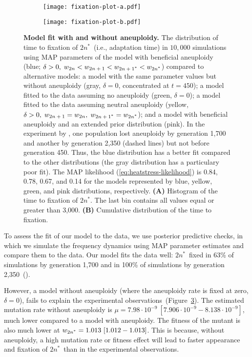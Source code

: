 \documentclass[12pt]{article}
\newcommand{\euwt}{\emph{$2n$}}
\newcommand{\anwt}{\emph{$2n+1$}}
\newcommand{\eumt}{\emph{$2n^*$}}
\newcommand{\anmt}{\emph{$2n+1^*$}}
\begin{document}
\begin{figure}[h!]
  \begin{subfigure}{0.5\textwidth}
      \centering
      \texttt{[image: fixation-plot-a.pdf]}      
      \label{fig:fit}
  \end{subfigure}
  \begin{subfigure}{0.5\textwidth}
      \centering
      \texttt{[image: fixation-plot-b.pdf]}      
      \label{fig:fit-cumulative}
  \end{subfigure}
  \caption{
    \textbf{Model fit with and without aneuploidy.}
    The distribution of time to fixation of \eumt\ (i.e., adaptation time) in $10,000$ simulations using MAP parameters of the model with beneficial aneuploidy (blue; $\delta>0, \; w_{\euwt}<w_{\anwt}<w_{\anmt}<w_{\eumt}$) compared to alternative models: a model with the same parameter values but without aneuploidy (gray, $\delta=0$, concentrated at $t=450$); a model fitted to the data assuming no aneuploidy (green, $\delta=0$); a model fitted to the data assuming neutral aneuploidy (yellow, $\delta>0, \; w_{\anwt}=w_{\euwt}, \; w_{\anmt}=w_{\eumt}$); and a model with beneficial aneuploidy and an extended prior distribution (pink).
In the experiment by \citet{Yona2012}, one population lost aneuploidy by generation 1,700 and another by generation 2,350 (dashed lines) but not before generation 450.
Thus, the blue distribution has a better fit compared to the other distributions (the gray distribution has a particulary poor fit).
The MAP likelihood (\cref{eq:heatstress-likelihood}) is 0.84, 0.78, 0.67, and 0.14 for the models represented by blue, yellow, green, and pink distributions, respectively. 
\textbf{(A)} Histogram of the time to fixation of \eumt. The last bin contains all values equal or greater than 3,000.
\textbf{(B)} Cumulative distribution of the time to fixation. 
     }
  \label{fig:2n*-fixation}
\end{figure}

To assess the fit of our model to the data, we use posterior predictive checks, in which we simulate the frequency dynamics using MAP parameter estimates and compare them to the data.
Our model fits the data well: \eumt\ fixed in 63\% of simulations by generation 1,700 and in 100\% of simulations by generation 2,350~().
 
However, a model without aneuploidy (where the aneuploidy rate is fixed at zero, $\delta=0$), fails to explain the experimental observations~(Figure~\ref{fig:2n*-fixation}). %
The estimated mutation rate without aneuploidy is $\mu=7.98\cdot10^{-9}\ [7.906\cdot10^{-9}-8.138\cdot10^{-9}]$, much lower compared to a model with aneuploidy.
The fitness of the mutant is also much lower at $w_{\eumt}=1.013\ [1.012-1.013]$.
This is because, without aneuploidy, a high mutation rate or fitness effect will lead to faster appearance and fixation of \eumt\ than in the experimental observations. 
\end{document}
